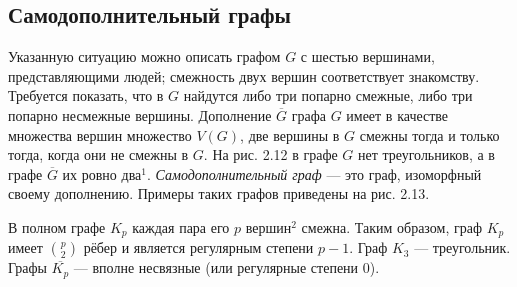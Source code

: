 \subsection{Самодополнительный графы}

Указанную ситуацию можно описать графом \( G \) с шестью вершинами, представляющими людей; смежность двух вершин соответствует знакомству. Требуется показать, что в \( G \) найдутся либо три попарно смежные, либо три попарно несмежные вершины. Дополнение \( \overline{G} \) графа \( G \) имеет в качестве множества вершин множество \( V(G) \), две вершины в \( G \) смежны тогда и только тогда, когда они не смежны в \( G \). На рис. 2.12 в графе \( G \) нет треугольников, а в графе \( \overline{G} \) их ровно два\(^1\). \textit{Самодополнительный граф} — это граф, изоморфный своему дополнению. Примеры таких графов приведены на рис. 2.13.

В полном графе \( K_p \) каждая пара его \( p \) вершин\(^2\) смежна. Таким образом, граф \( K_p \) имеет \(\binom{p}{2}\) рёбер и является регулярным степени \( p-1 \). Граф \( K_3 \) — треугольник. Графы \( \overline{K_p} \) — вполне несвязные (или регулярные степени 0).